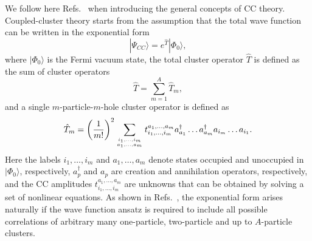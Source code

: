 \documentclass[a4paper,12pt]{report}
\begin{document}
We follow here Refs.~\cite{harris,crawford} when introducing the general concepts of CC theory. Coupled-cluster theory starts from the assumption that the total wave function can be written in the exponential form 
\begin{equation}
  |\Psi_{CC}\rangle = e^{\hat{T}}|\Phi_{0}\rangle ,
\end{equation}  
where $|\Phi_{0}\rangle $ is the Fermi vacuum state, the total cluster operator $\hat{T}$ is defined as the sum of cluster operators
\begin{equation}
  \hat{T} = \sum_{m=1}^{A}\hat{T}_{m},
  \label{eq:sum_cluster}
\end{equation} 
and a single $m$-particle-$m$-hole cluster operator is defined as
\begin{align}
  \hat{T}_{m} = \left( \frac{1}{m!}\right)^{2}\sum_{i_{1}, \dots ,i_{m}\atop a_{1}, \dots , a_{m}}t_{i_{1}, \dots , i_{m}}^{a_{1}, \dots , a_{m}}a_{a_{1}}^{\dagger }\dots a_{a_{m}}^{\dagger }a_{i_{m}}\dots a_{i_{1}}. 
\end{align} 
Here the labels $i_{1}, \dots , i_{m}$ and $a_{1}, \dots , a_{m}$ denote states occupied and unoccupied in $|\Phi_{0}\rangle $, respectively, $a_{p}^{\dagger }$ and $a_{p}$ are creation and annihilation operators, respectively, and the CC amplitudes $t_{i_{1}, \dots , i_{m}}^{a_{1}, \dots , a_{m}}$ are unknowns that can be obtained by solving a set of nonlinear equations. As shown in Refs.~\cite{harris,crawford}, the exponential form arises naturally if the wave function ansatz is required to include all possible correlations of arbitrary many one-particle, two-particle and up to $A$-particle clusters. 

\end{document}
